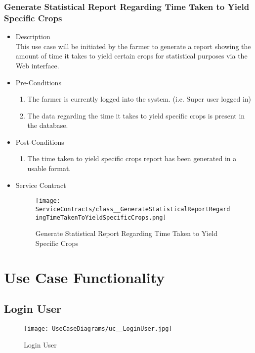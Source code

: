 \documentclass[11pt,fleqn]{book} %
\begin{document}
\subsection{Generate Statistical Report Regarding Time Taken to Yield Specific Crops}
\begin{itemize}
	\item Description\\
	This use case will be initiated by the farmer to generate a report showing the amount of time it takes to yield certain crops for statistical purposes via the Web interface.
	\item Pre-Conditions
	\begin{enumerate}
		\item The farmer is currently logged into the system. (i.e. Super user logged in)
		\item The data regarding the time it takes to yield specific crops is present in the database.
	\end{enumerate}
	\item Post-Conditions
	\begin{enumerate}
		\item The time taken to yield specific crops report has been generated in a usable format.
	\end{enumerate}
	\item Service Contract
	\begin{figure}
		\texttt{[image: ServiceContracts/class\_\_GenerateStatisticalReportRegardingTimeTakenToYieldSpecificCrops.png]}
		\caption{Generate Statistical Report Regarding Time Taken to Yield Specific Crops}
	\end{figure}
\end{itemize}
\newpage




\chapter{Use Case Functionality} %

	\section{Login User}
	\begin{figure}
		\texttt{[image: UseCaseDiagrams/uc\_\_LoginUser.jpg]}
		\caption{Login User}
	\end{figure}
	
\end{document}

